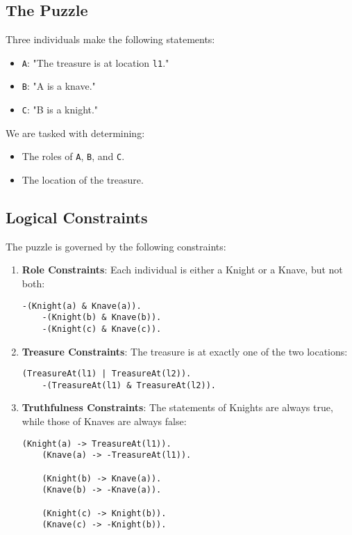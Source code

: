 \documentclass[a4paper,12pt]{article}
\begin{document}
\subsection{The Puzzle}
Three individuals make the following statements:
\begin{itemize}
    \item \texttt{A}: "The treasure is at location \texttt{l1}."
    \item \texttt{B}: "A is a knave."
    \item \texttt{C}: "B is a knight."
\end{itemize}
We are tasked with determining:
\begin{itemize}
    \item The roles of \texttt{A}, \texttt{B}, and \texttt{C}.
    \item The location of the treasure.
\end{itemize}

\subsection{Logical Constraints}
The puzzle is governed by the following constraints:
\begin{enumerate}
    \item \textbf{Role Constraints}:
    Each individual is either a Knight or a Knave, but not both:
    \begin{lstlisting}[language=Prover9]
    -(Knight(a) & Knave(a)).
    -(Knight(b) & Knave(b)).
    -(Knight(c) & Knave(c)).
    \end{lstlisting}

    \item \textbf{Treasure Constraints}:
    The treasure is at exactly one of the two locations:
    \begin{lstlisting}[language=Prover9]
    (TreasureAt(l1) | TreasureAt(l2)).
    -(TreasureAt(l1) & TreasureAt(l2)).
    \end{lstlisting}

    \item \textbf{Truthfulness Constraints}:
    The statements of Knights are always true, while those of Knaves are always false:
    \begin{lstlisting}[language=Prover9]
    (Knight(a) -> TreasureAt(l1)).
    (Knave(a) -> -TreasureAt(l1)).
    
    (Knight(b) -> Knave(a)).
    (Knave(b) -> -Knave(a)).
    
    (Knight(c) -> Knight(b)).
    (Knave(c) -> -Knight(b)).
    \end{lstlisting}
\end{enumerate}
\end{document}
